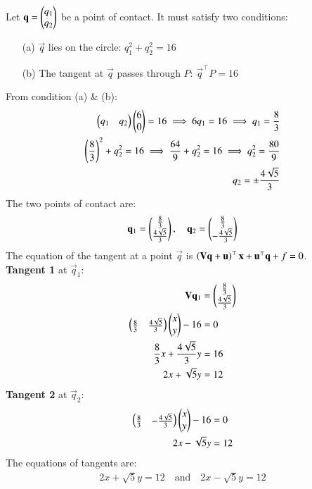 \documentclass[article]{IEEEtran}
\begin{document}
	Let $\mathbf{q} = \begin{pmatrix}q_1\\q_2\end{pmatrix}$ be a point of contact. It must satisfy two conditions:
	\begin{enumerate}
		\item[(a)] $\vec{q}$ lies on the circle: $q_1^2 + q_2^2 = 16$
		\item[(b)] The tangent at $\vec{q}$ passes through $P$: $\vec{q}^\top P = 16$
	\end{enumerate}
From condition (a) \& (b):
	\begin{align}
		\begin{pmatrix}q_1 & q_2\end{pmatrix}\begin{pmatrix}6\\0\end{pmatrix} = 16 \implies 6q_1 = 16 \implies q_1 = \frac{8}{3}\\
		\left(\frac{8}{3}\right)^2 + q_2^2 = 16 \implies \frac{64}{9} + q_2^2 = 16 \implies q_2^2 = \frac{80}{9}\\
		q_2 = \pm\frac{4\sqrt{5}}{3}
	\end{align}
The two points of contact are:
	\begin{equation}
		\mathbf{q}_1 = \begin{pmatrix}\frac{8}{3}\\\frac{4\sqrt{5}}{3}\end{pmatrix}, \quad \mathbf{q}_2 = \begin{pmatrix}\frac{8}{3}\\-\frac{4\sqrt{5}}{3}\end{pmatrix}
	\end{equation}
	The equation of the tangent at a point $\vec{q}$ is $\left(\mathbf{V}\mathbf{q} + \mathbf{u}\right)^\top \mathbf{x} + \mathbf{u}^\top \mathbf{q} + f = 0$.\\
	\textbf{Tangent 1} at $\vec{q}_1 $:
	\begin{align}
		\mathbf{V}\mathbf{q}_1 &= \begin{pmatrix}\frac{8}{3}\\\frac{4\sqrt{5}}{3}\end{pmatrix}\\
		\begin{pmatrix}\frac{8}{3} & \frac{4\sqrt{5}}{3}\end{pmatrix}\begin{pmatrix}x\\y\end{pmatrix} - 16 &= 0\\
		\frac{8}{3}x + \frac{4\sqrt{5}}{3}y &= 16\\
		2x + \sqrt{5}y &= 12
	\end{align}
	\textbf{Tangent 2} at $\vec{q}_2 $:
	\begin{align}
		\begin{pmatrix}\frac{8}{3} & -\frac{4\sqrt{5}}{3}\end{pmatrix}\begin{pmatrix}x\\y\end{pmatrix} - 16 &= 0\\
		2x - \sqrt{5}y &= 12
	\end{align}
The equations of tangents are:
	\begin{align}
		\boxed{2x + \sqrt{5}y = 12 \quad \text{and} \quad 2x - \sqrt{5}y = 12}
	\end{align}
\end{document}
